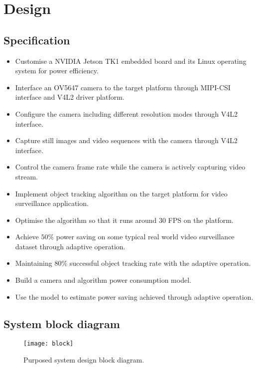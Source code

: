 \chapter{Design} \label{Chapter:Design}

\section{Specification}


\begin{itemize}
	\setlength\itemsep{0em}
	\item Customise a NVIDIA Jetson TK1 embedded board and its Linux operating system for power efficiency.
	\item Interface an OV5647 camera to the target platform through MIPI-CSI interface and V4L2 driver platform.
	\item Configure the camera including different resolution modes through V4L2 interface.
	\item Capture still images and video sequences with the camera through V4L2 interface.
	\item Control the camera frame rate while the camera is actively capturing video stream.
	\item Implement object tracking algorithm on the target platform for video surveillance application.
	\item Optimise the algorithm so that it runs around $30$ FPS on the platform.
	\item Achieve $50\%$ power saving on some typical real world video surveillance dataset through adaptive operation.
	\item Maintaining $80\%$ successful object tracking rate with the adaptive operation.
	\item Build a camera and algorithm power consumption model.
	\item Use the model to estimate power saving achieved through adaptive operation.
\end{itemize}

\section{System block diagram}

\begin{figure}[H]
  \centering
  \texttt{[image: block]}
  \caption{Purposed system design block diagram.}
  \label{block}
\end{figure}


